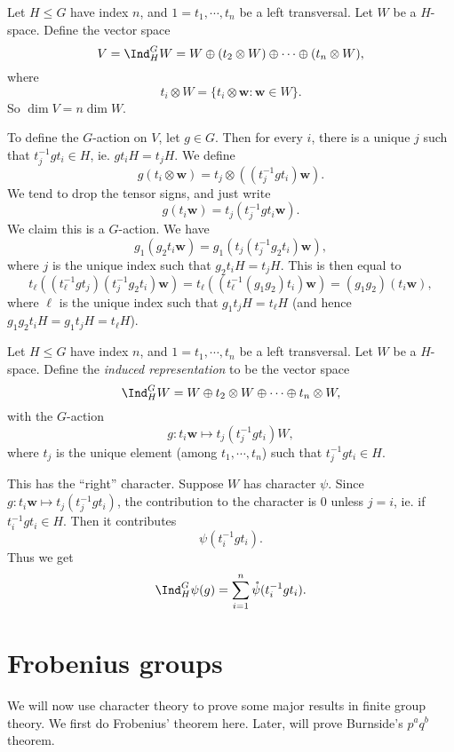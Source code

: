 \documentclass[a4paper]{article}
\begin{document}
Let $H \leq G$ have index $n$, and $1 = t_1, \cdots, t_n$ be a left transversal. Let $W$ be a $H$-space. Define the vector space
\[
  V = \Ind_H^G W = W \oplus (t_2 \otimes W) \oplus \cdots \oplus (t_n \otimes W),
\]
where
\[
  t_i \otimes W = \{t_i \otimes \mathbf{w}: \mathbf{w} \in W\}.
\]
So $\dim V = n \dim W$.

To define the $G$-action on $V$, let $g \in G$. Then for every $i$, there is a unique $j$ such that $t_j^{-1} g t_i \in H$, ie. $gt_iH = t_j H$. We define
\[
  g(t_i \otimes \mathbf{w}) = t_j \otimes ((t_j^{-1}gt_i) \mathbf{w}).
\]
We tend to drop the tensor signs, and just write
\[
  g(t_i \mathbf{w}) = t_j (t_j^{-1} g t_i \mathbf{w}).
\]
We claim this is a $G$-action. We have
\[
  g_1(g_2 t_i \mathbf{w}) = g_1(t_j(t_j^{-1} g_2 t_i)\mathbf{w}),
\]
where $j$ is the unique index such that $g_2 t_i H = t_j H$. This is then equal to
\[
  t_\ell ((t_\ell^{-1} g t_j)(t_j^{-1} g_2 t_i) \mathbf{w}) = t_\ell((t_\ell^{-1}(g_1g_2)t_i) \mathbf{w}) = (g_1g_2)(t_i \mathbf{w}),
\]
where $\ell$ is the unique index such that $g_1 t_j H = t_\ell H$ (and hence $g_1 g_2 t_i H = g_1 t_j H = t_\ell H$).

\begin{defi}
  Let $H \leq G$ have index $n$, and $1 = t_1, \cdots, t_n$ be a left transversal. Let $W$ be a $H$-space. Define the \emph{induced representation} to be the vector space
  \[
    \Ind_H^G W = W \oplus t_2 \otimes W \oplus \cdots \oplus t_n \otimes W,
  \]
  with the $G$-action
  \[
    g: t_i \mathbf{w} \mapsto t_j (t_j^{-1} g t_i)W,
  \]
  where $t_j$ is the unique element (among $t_1, \cdots, t_n$) such that $t_j^{-1} gt_i \in H$.
\end{defi}

This has the ``right'' character. Suppose $W$ has character $\psi$. Since $g: t_i \mathbf{w} \mapsto t_j (t_j^{-1} gt_i)$, the contribution to the character is $0$ unless $j = i$, ie. if $t_i^{-1} g t_i \in H$. Then it contributes
\[
  \psi (t_i^{-1} g t_i).
\]
Thus we get
\[
  \Ind_H^G \psi(g) = \sum_{i = 1}^n \mathring{\psi}(t_i^{-1} g t_i).
\]

\section{Frobenius groups}
We will now use character theory to prove some major results in finite group theory. We first do Frobenius' theorem here. Later, will prove Burnside's $p^a q^b$ theorem.
\end{document}
